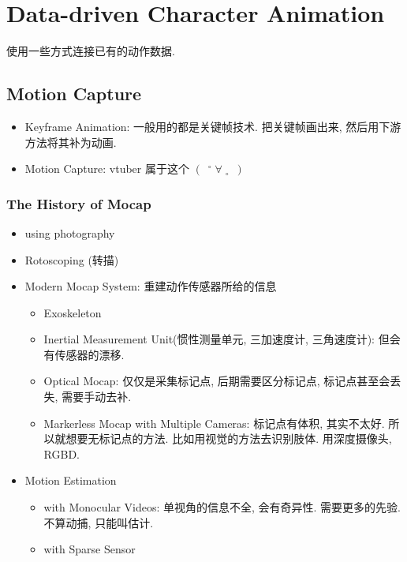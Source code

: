 \newpage
\section{Data-driven Character Animation}
使用一些方式连接已有的动作数据.

\subsection{Motion Capture}

\begin{itemize}
    \item Keyframe Animation: 一般用的都是关键帧技术. 把关键帧画出来, 然后用下游方法将其补为动画. 
    \item Motion Capture: vtuber 属于这个 $\left(\enspace{}^{\circ}\;\forall\;{}_{\circ}\enspace\right)$
\end{itemize}

\subsubsection{The History of Mocap}

\begin{itemize}
    \item using photography
    \item Rotoscoping (转描)
    \item Modern Mocap System: 重建动作传感器所给的信息
    \begin{itemize}
        \item Exoskeleton
        \item Inertial Measurement Unit(惯性测量单元, 三加速度计, 三角速度计): 但会有传感器的漂移. 
        \item Optical Mocap: 仅仅是采集标记点, 后期需要区分标记点, 标记点甚至会丢失, 需要手动去补.
        \item Markerless Mocap with Multiple Cameras: 标记点有体积, 其实不太好. 所以就想要无标记点的方法. 
        \subitem 比如用视觉的方法去识别肢体. 
        \subitem 用深度摄像头, RGBD.
    \end{itemize}
    \item Motion Estimation 
    \begin{itemize}
        \item with Monocular Videos: 单视角的信息不全, 会有奇异性. 需要更多的先验. 不算动捕, 只能叫估计.
        \item with Sparse Sensor
    \end{itemize}
\end{itemize}


